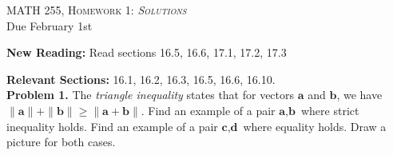 \documentclass[12pt]{report} %
\theoremstyle{definition}
\begin{document}
\begin{center}
   \textsc{\large MATH 255, Homework 1: \emph{Solutions}}\\
   Due February 1st
\end{center}
\vspace{.5cm}

\noindent\textbf{New Reading:} Read sections 16.5, 16.6, 17.1, 17.2, 17.3

\noindent\textbf{Relevant Sections:} 16.1, 16.2, 16.3, 16.5, 16.6, 16.10.\\

\noindent\textbf{Problem 1.} The \emph{triangle inequality} states that for vectors $\textbf{a}$ and $\textbf{b}$, we have $\|\textbf{a}\|+\|\textbf{b}\|\geq \|\textbf{a}+\textbf{b}\|$. Find an example of a pair $\textbf{a},\textbf{b}$ where strict inequality holds. Find an example of a pair $\textbf{c},\textbf{d}$ where equality holds. Draw a picture for both cases.
\end{document}
